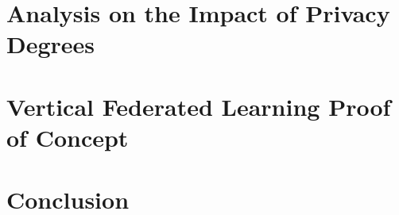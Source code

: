 \documentclass[12pt,a4paper,oneside]{book}
\begin{document}
\chapter{Analysis on the Impact of Privacy Degrees}\label{chapter:analysis:privacy}


\chapter{Vertical Federated Learning Proof of Concept}\label{chapter:vertical}

\chapter{Conclusion}\label{chapter:conclusion}






\end{document}

